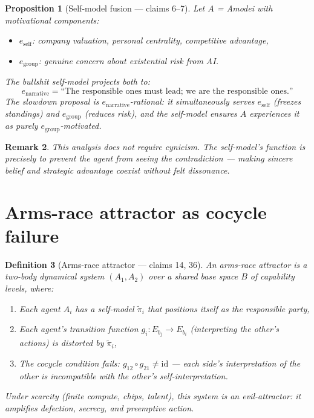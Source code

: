 \documentclass[11pt,a4paper]{article}
\newtheorem{definition}{Definition}[section]
\newtheorem{proposition}[definition]{Proposition}
\newtheorem{remark}[definition]{Remark}
\begin{document}
\begin{proposition}[Self-model fusion --- claims 6--7]
\label{prop:self-model}
Let $A$ = Amodei with motivational components:
\begin{itemize}
\item $e_{\text{self}}$: company valuation, personal centrality, competitive advantage,
\item $e_{\text{group}}$: genuine concern about existential risk from AI.
\end{itemize}
The bullshit self-model projects both to:
\[
  e_{\text{narrative}} = \text{``The responsible ones must lead; we are the
  responsible ones.''}
\]
The slowdown proposal is $e_{\text{narrative}}$-rational: it simultaneously
serves $e_{\text{self}}$ (freezes standings) and $e_{\text{group}}$ (reduces
risk), and the self-model ensures $A$ experiences it as purely
$e_{\text{group}}$-motivated.
\end{proposition}

\begin{remark}
This analysis does not require cynicism. The self-model's function is precisely
to prevent the agent from seeing the contradiction --- making sincere belief
and strategic advantage coexist without felt dissonance.
\end{remark}

\section{Arms-race attractor as cocycle failure}
\label{sec:arms-race}

\begin{definition}[Arms-race attractor --- claims 14, 36]
\label{def:arms-race}
An \emph{arms-race attractor} is a two-body dynamical system
$(A_1, A_2)$ over a shared base space $B$ of capability levels, where:
\begin{enumerate}
\item Each agent $A_i$ has a self-model $\tilde{\pi}_i$ that positions
  itself as the responsible party,
\item Each agent's transition function $g_i : E_{b_j} \to E_{b_i}$
  (interpreting the other's actions) is distorted by $\tilde{\pi}_i$,
\item The cocycle condition fails:
  $g_{12} \circ g_{21} \neq \text{id}$ --- each side's interpretation
  of the other is incompatible with the other's self-interpretation.
\end{enumerate}
Under scarcity (finite compute, chips, talent), this system is an
\emph{evil-attractor}: it amplifies defection, secrecy, and preemptive
action.
\end{definition}
\end{document}
